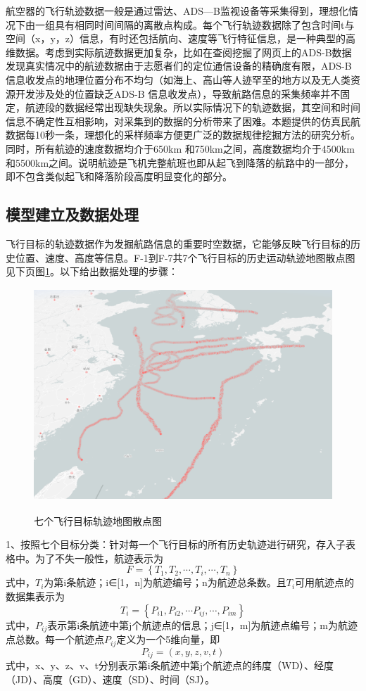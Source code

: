 \documentclass[GBK]{ctexart}
\begin{document}
\begin{spacing}{1.5}
航空器的飞行轨迹数据一般是通过雷达、ADS—B监视设备等采集得到，理想化情况下由一组具有相同时间间隔的离散点构成。每个飞行轨迹数据除了包含时间t与空间（x，y，z）信息，有时还包括航向、速度等飞行特征信息，是一种典型的高维数据。考虑到实际航迹数据更加复杂，比如在查阅挖掘了网页\cite{map}\cite{aware}上的ADS-B数据发现真实情况中的航迹数据由于志愿者们的定位通信设备的精确度有限，ADS-B信息收发点的地理位置分布不均匀（如海上、高山等人迹罕至的地方以及无人类资源开发涉及处的位置缺乏ADS-B 信息收发点），导致航路信息的采集频率并不固定，航迹段的数据经常出现缺失现象。所以实际情况下的轨迹数据，其空间和时间信息不确定性互相影响，对采集到的数据的分析带来了困难。本题提供的仿真民航数据每10秒一条，理想化的采样频率方便更广泛的数据规律挖掘方法的研究分析。同时，所有航迹的速度数据均介于650km 和750km之间，高度数据均介于4500km和5500km之间。说明航迹是飞机完整航班也即从起飞到降落的航路中的一部分，即不包含类似起飞和降落阶段高度明显变化的部分。
\subsection{模型建立及数据处理}
飞行目标的轨迹数据作为发掘航路信息的重要时空数据，它能够反映飞行目标的历史位置、速度、高度等信息。F-1到F-7共7个飞行目标的历史运动轨迹地图散点图见下页图\ref{quantiyuanshi}。以下给出数据处理的步骤：
\begin{figure}[h]
  \centering
  \includegraphics[width=15cm,height=8cm]{quantiyuanshi.png}\\
  \caption{七个飞行目标轨迹地图散点图}\label{quantiyuanshi}
\end{figure}
1、按照七个目标分类：针对每一个飞行目标的所有历史轨迹进行研究，存入子表格中。为了不失一般性，航迹表示为
\begin{equation}
F=\left\{T_{1}, T_{2}, \cdots, T_{i}, \cdots, T_{n}\right\}
\end{equation}
式中，$T_{i}$为第i条航迹；i∈[1，n]为航迹编号；n为航迹总条数。且$T_{i}$可用航迹点的数据集表示为
\begin{equation}
T_{i}=\left\{P_{i 1}, P_{i 2}, \cdots P_{i j}, \cdots, P_{im}\right\}
\end{equation}
式中，$P_{i j}$表示第i条航迹中第j个航迹点的信息；j∈[1，m]为航迹点编号；m为航迹点总数。每一个航迹点$P_{i j}$定义为一个5维向量，即
\begin{equation}
P_{i j}=(x, y, z, v, t)
\end{equation}
式中，x、y、z、v、t分别表示第i条航迹中第j个航迹点的纬度（WD）、经度（JD）、高度（GD）、速度（SD）、时间（SJ）。


\end{spacing}
\end{document}
